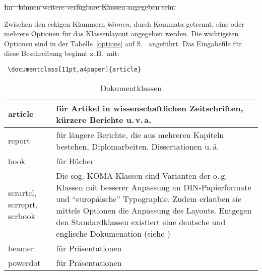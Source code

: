 \sout{Im \local\ können weitere verfügbare Klassen angegeben sein.}
 
Zwischen den eckigen Klammern \emph{können}, durch Kommata getrennt, eine oder 
mehrere Optionen für das Klassenlayout angegeben werden. Die wichtigsten 
Optionen sind in der Tabelle~\ref{options} auf S.~\pageref{options} angeführt.
Das Eingabefile für diese Beschreibung beginnt z.\,B.\ mit:
\begin{lstlisting}
 \documentclass[11pt,a4paper]{article}
\end{lstlisting}

\begin{table}[!hbpt]
\small
\caption{Dokumentklassen}
\label{docstyles}
\centering
\renewcommand\arraystretch{1.5}
\begin{tabularx}{.95\linewidth}%
      {@{}>{\raggedright\arraybackslash\ttfamily}p{2.2cm}X@{}}
\toprule
 article & 
 für Artikel in wissenschaftlichen Zeitschriften,  kürzere Berichte u.\,v.\,a. 
\\\midrule
 report & 
 für längere Berichte, die aus mehreren Kapiteln bestehen, Diplomarbeiten, 
 Dissertationen u.\,ä. 
\\\midrule
 book   &  
 für Bücher 
\\\midrule
 scrartcl, scrreprt, scrbook & 
 Die sog. KOMA-Klassen sind Varianten der o.\,g. Klassen mit besserer Anpassung 
 an DIN-Papierformate und "`europäische"' Typographie. Zudem erlauben sie 
 mittels Optionen die Anpassung des Layouts. Entgegen den Standardklassen 
 existiert eine deutsche und englische Dokumenation (siehe \cite{scrguide})
\\\midrule
 beamer &
 für Präsentationen 
\\\midrule
 powerdot &
 für Präsentationen 
\\
\bottomrule
\end{tabularx}

\end{table}

